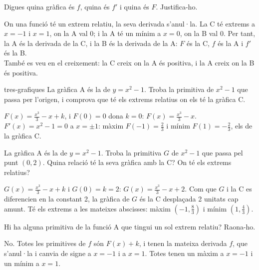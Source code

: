 \begin{apartats}

Digues quina gràfica és $f$, quina és $f'$ i quina és $F$. Justifica-ho.

\begin{solucio}
On una funció té un extrem relatiu, la seva derivada s'anul·la. La C té extrems a $x=-1$ i $x=1$, on la
A val 0; i la A té un mínim a $x=0$, on la B val 0. Per tant, la A és la derivada de la C, i la B és la
derivada de la A: $F$ és la C, $f$ és la A i $f'$ és la B.\\
També es veu en el creixement: la C creix on la A és positiva, i la A creix on la B és positiva.
\end{solucio}

\begin{tria}{tres-grafiques}
La gràfica A és la de $y=x^2-1$. Troba la primitiva de $x^2-1$ que passa per l'origen, i comprova que
té els extrems relatius on els té la gràfica C.

\begin{solucio}
$F(x)=\frac{x^3}{3}-x+k$, i $F(0)=0$ dona $k=0$: $F(x)=\frac{x^3}{3}-x$. $F'(x)=x^2-1=0$ a $x=\pm1$:
màxim $F(-1)=\frac23$ i mínim $F(1)=-\frac23$, els de la gràfica C.
\end{solucio}

La gràfica A és la de $y=x^2-1$. Troba la primitiva $G$ de $x^2-1$ que passa pel punt $(0,2)$. Quina
relació té la seva gràfica amb la C? On té els extrems relatius?

\begin{solucio}
$G(x)=\frac{x^3}{3}-x+k$ i $G(0)=k=2$: $G(x)=\frac{x^3}{3}-x+2$. Com que $G$ i la C es diferencien en la
constant 2, la gràfica de $G$ és la C desplaçada 2 unitats cap amunt. Té els extrems a les mateixes
abscisses: màxim $\left(-1,\frac83\right)$ i mínim $\left(1,\frac43\right)$.
\end{solucio}
\end{tria}

\begin{nomesllarg}
Hi ha alguna primitiva de la funció A que tingui un sol extrem relatiu? Raona-ho.

\begin{solucio}
No. Totes les primitives de $f$ són $F(x)+k$, i tenen la mateixa derivada $f$, que s'anul·la i canvia
de signe a $x=-1$ i a $x=1$. Totes tenen un màxim a $x=-1$ i un mínim a $x=1$.
\end{solucio}
\end{nomesllarg}

\end{apartats}
